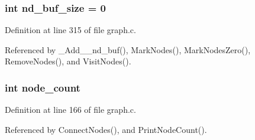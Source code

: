 \subsubsection{\setlength{\rightskip}{0pt plus 5cm}int \bf{nd\_\-buf\_\-size} = 0\hspace{0.3cm}{\tt  [static]}}\label{graph_8c_34cedced8e2596ea2baaffdb6229e647}




Definition at line 315 of file graph.c.

Referenced by \_\-Add\_\_\-nd\_\-buf(), Mark\-Nodes(), Mark\-Nodes\-Zero(), Remove\-Nodes(), and Visit\-Nodes().
\subsubsection{\setlength{\rightskip}{0pt plus 5cm}int \bf{node\_\-count}\hspace{0.3cm}{\tt  [static]}}\label{graph_8c_b5abb737ffd89b661cbcc345019609b0}




Definition at line 166 of file graph.c.

Referenced by Connect\-Nodes(), and Print\-Node\-Count().